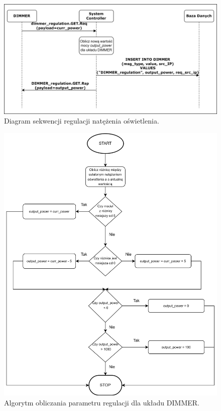             \begin{figure}[H]
                \centering
                \includegraphics[width=0.8\linewidth]{graphics/sequence-diagrams/dimmer-regulate-seq.png}
                \caption{Diagram sekwencji regulacji natężenia oświetlenia.}
                \label{fig:seq-dimmer-regulate}
            \end{figure}

            \begin{figure}[H]
                \centering
                \includegraphics[width=0.8\linewidth]{graphics/dimmer-block-diagram.png}
                \caption{Algorytm obliczania parametru regulacji dla układu DIMMER.}
                \label{fig:seq-dimmer-algo}
            \end{figure}

